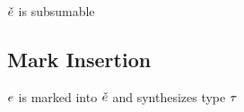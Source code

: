 \documentclass{article}
\begin{document}
\judgbox{\subsumable{\ECMV}} $\ECMV$ is subsumable
%
\begin{mathpar}






\end{mathpar}

\subsection{Mark Insertion}
\judgbox{\ctxSynFixedInto{\ctx}{\EMV}{\ECMV}{\TMV}} $\EMV$ is marked into $\ECMV$ and
synthesizes type $\TMV$
%
\end{document}
